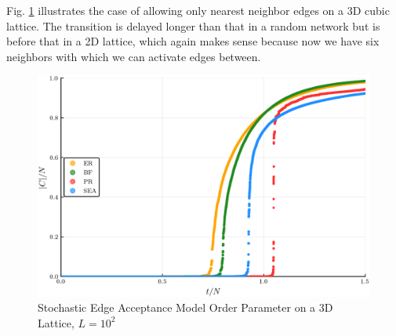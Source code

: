 Fig. \ref{fig:Lattice3D_ER_BF_PR_SEA_transition} illustrates the case of allowing only nearest neighbor edges on a 3D cubic lattice. The transition is delayed longer than that in a random network but is before that in a 2D lattice, which again makes sense because now we have six neighbors with which we can activate edges between.

\begin{figure}[H]
	\centering
	\includegraphics[width=350pt, clip]{images/Lattice3D_ER_BF_PR_SEA_1e6_order_param.png}
	\caption{Stochastic Edge Acceptance Model Order Parameter on a 3D Lattice, $L = 10^2$}
	\label{fig:Lattice3D_ER_BF_PR_SEA_transition}
\end{figure}
